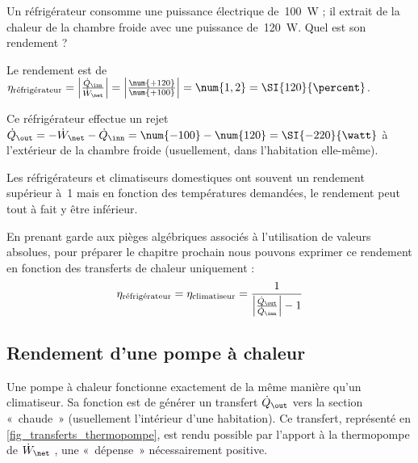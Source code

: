 		\begin{anexample}
			Un réfrigérateur consomme une puissance électrique de~\SI{100}{\watt} ; il extrait de la chaleur de la chambre froide avec une puissance de~\SI{120}{\watt}. Quel est son rendement ?
	
			\begin{answer}
				Le rendement est de $\eta_\text{réfrigérateur} = \left| \frac{\dot Q_\inn}{\dot W_\net} \right| = \left| \frac{\num{+120}}{\num{+100}} \right| = \num{1,2} = \SI{120}{\percent}$. 
					\begin{remark} Ce réfrigérateur effectue un rejet $\dot Q_\out = -\dot W_\net - \dot Q_\inn = \num{-100} - \num{120}= \SI{-220}{\watt}$ à l’extérieur de la chambre froide (usuellement, dans l’habitation elle-même).\end{remark}
					\begin{remark} Les réfrigérateurs et climatiseurs domestiques ont souvent un rendement supérieur à~\num{1} mais en fonction des températures demandées, le rendement peut tout à fait y être inférieur.\end{remark}
			\end{answer}
		\end{anexample}

		En prenant garde aux pièges algébriques associés à l’utilisation de valeurs absolues, pour préparer le chapitre prochain nous pouvons exprimer ce rendement en fonction des transferts de chaleur uniquement :
		\begin{equation}
			\eta _\text{réfrigérateur} = \eta _\text{climatiseur} = \frac{1}{\left| \frac{\dot Q_\out}{\dot Q_\inn} \right| - 1}
			\label{rendement_réfrigérateur_qin_qout}
		\end{equation}





	\subsection{Rendement d’une pompe à chaleur}
	\label{ch_rendement_thermopompe}

		Une pompe à chaleur fonctionne exactement de la même manière qu’un climatiseur. Sa fonction est de générer un transfert $\dot Q_\out$ vers la section «~chaude~» (usuellement l’intérieur d’une habitation). Ce transfert, représenté en \cref{fig_transferts_thermopompe}, est rendu possible par l’apport à la thermopompe de $\dot W_\net$ , une «~dépense~» nécessairement positive.

